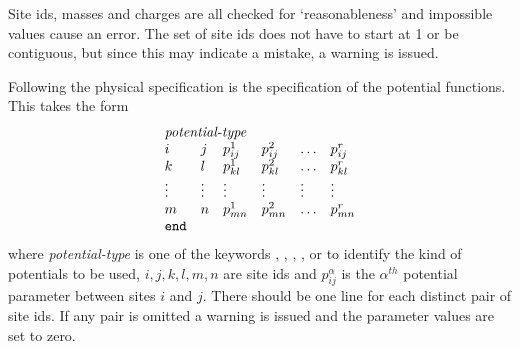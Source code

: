 \documentclass[a4paper,twoside]{report}
\begin{document}
Site ids, masses and charges are all checked for `reasonableness'
and impossible values cause an error. The set of site ids does not
have to start at 1 or be contiguous, but since this may indicate a
mistake, a warning is issued.

Following the physical specification is the specification of the
potential functions. This takes the form
\begin{displaymath}
\begin{array}{llllll}
\multicolumn{4}{l}{\textit{potential-type}} \\
i & j & p^{1}_{ij} & p^{2}_{ij} & \ldots & p^{r}_{ij}  \\
k & l & p^{1}_{kl} & p^{2}_{kl} & \ldots & p^{r}_{kl}  \\
\vdots & \vdots & \vdots & \vdots & \vdots & \vdots \\
m & n & p^{1}_{mn} & p^{2}_{mn} & \ldots & p^{r}_{mn}  \\
\Lit{end} \\
\end{array}
\end{displaymath}
where \emph{potential-type} is one of the keywords
, , , ,
 or  to identify the kind of potentials to be
used, $i, j, k, l, m, n$ are site ids and $p^{\alpha}_{ij}$ is the
$\alpha^{th}$ potential parameter between sites $i$ and $j$.  There should
be one line for each distinct pair of site ids.  If any pair is
omitted a warning is issued and the parameter values are set to zero.
\end{document}
